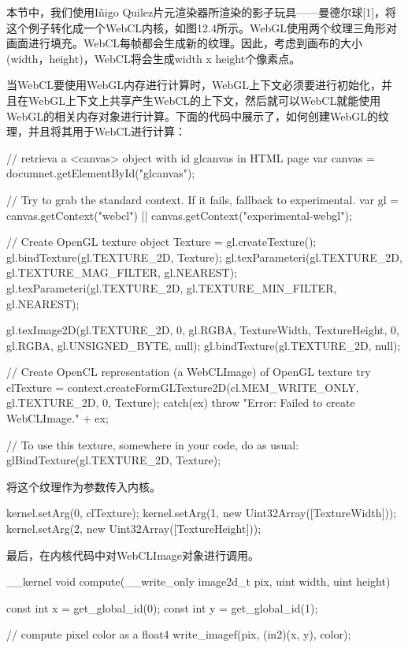 本节中，我们使用Iñigo Quilez片元渲染器所渲染的影子玩具——曼德尔球[1]，将这个例子转化成一个WebCL内核，如图12.4所示。WebGL使用两个纹理三角形对画面进行填充。WebCL每帧都会生成新的纹理。因此，考虑到画布的大小(width，height)，WebCL将会生成width x height个像素点。


当WebCL要使用WebGL内存进行计算时，WebGL上下文必须要进行初始化，并且在WebGL上下文上共享产生WebCL的上下文，然后就可以WebCL就能使用WebGL的相关内存对象进行计算。下面的代码中展示了，如何创建WebGL的纹理，并且将其用于WebCL进行计算：

\begin{codebox}[javascript]
// retrieva a <canvas> object with id glcanvas in HTML page
var canvas = documnet.getElementById("glcanvas");

// Try to grab the standard context. If it fails, fallback to experimental.
var gl = canvas.getContext("webcl") || canvas.getContext("experimental-webgl");

// Create OpenGL texture object
Texture = gl.createTexture();
gl.bindTexture(gl.TEXTURE_2D, Texture);
gl.texParameteri(gl.TEXTURE_2D, gl.TEXTURE_MAG_FILTER, gl.NEAREST);
gl.texParameteri(gl.TEXTURE_2D, gl.TEXTURE_MIN_FILTER, gl.NEAREST);

gl.texImage2D(gl.TEXTURE_2D, 0, gl.RGBA, TextureWidth, TextureHeight, 0, gl.RGBA, gl.UNSIGNED_BYTE, null);
gl.bindTexture(gl.TEXTURE_2D, null);

// Create OpenCL representation (a WebCLImage) of OpenGL texture
try{
  clTexture = context.createFormGLTexture2D(cl.MEM_WRITE_ONLY, gl.TEXTURE_2D, 0, Texture);
} catch(ex) {
  throw "Error: Failed to create WebCLImage." + ex;
}

// To use this texture, somewhere in your code, do as usual:
glBindTexture(gl.TEXTURE_2D, Texture);
\end{codebox}

将这个纹理作为参数传入内核。

\begin{codebox}[javascript]
kernel.setArg(0, clTexture);
kernel.setArg(1, new Uint32Array([TextureWidth]));
kernel.setArg(2, new Uint32Array([TextureHeight]));
\end{codebox}

最后，在内核代码中对WebCLImage对象进行调用。

\begin{codebox}[cpp]
__kernel
void compute(__write_only image2d_t pix, uint width, uint height){
  const int x = get_global_id(0);
  const int y = get_global_id(1);

  // compute pixel color as a float4
  write_imagef(pix, (in2)(x, y), color);
}
\end{codebox}

